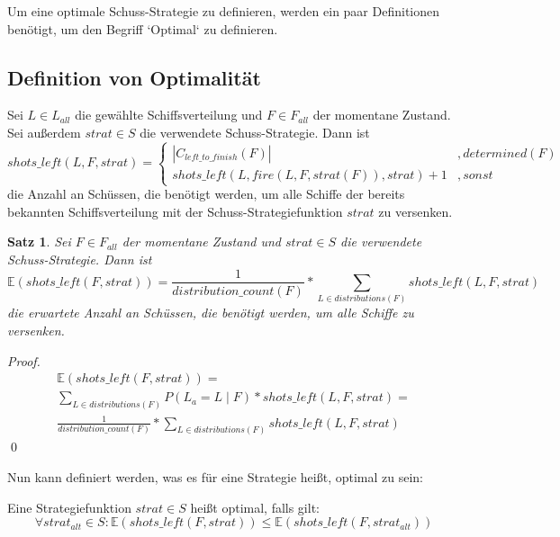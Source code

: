 \documentclass[a4paper,12pt]{llncs}
\numberwithin{equation}{section}
\newtheorem{satz}{Satz}
\begin{document}
Um eine optimale Schuss-Strategie zu definieren, werden ein paar Definitionen benötigt, um den Begriff `Optimal` zu definieren.

\subsection{Definition von Optimalität}

\begin{definition}
Sei $L\in L_{all}$ die gewählte Schiffsverteilung und $F\in F_{all}$ der momentane Zustand.
Sei außerdem $strat \in S$ die verwendete Schuss-Strategie.
Dann ist
\[
shots\_left(L, F, strat)=
  \begin{cases} 
  	|C_{left\_to\_finish}(F)|& ,determined(F) \\
      shots\_left(L, fire(L, F, strat(F)), strat) + 1 & ,sonst
   \end{cases}
\]
die Anzahl an Schüssen, die benötigt werden, um alle Schiffe der bereits bekannten Schiffsverteilung mit der Schuss-Strategiefunktion $strat$ zu versenken.
\end{definition}

\begin{satz}
Sei $F\in F_{all}$ der momentane Zustand und $strat \in S$ die verwendete Schuss-Strategie.
Dann ist
\[
\mathds{E}(shots\_left(F, strat))=\frac{1}{distribution\_count(F)} * \sum_{L \in distributions(F)}{shots\_left(L, F, strat)}
\]
die erwartete Anzahl an Schüssen, die benötigt werden, um alle Schiffe zu versenken.
\end{satz}

\begin{proof}
\begin{align}
\mathds{E}(shots\_left(F, strat))=\\
\sum_{L \in distributions(F)}{P(L_a= L \mid F) * shots\_left(L, F, strat)} =\\
\frac{1}{distribution\_count(F)} * \sum_{L \in distributions(F)}{shots\_left(L, F, strat)}
\end{align}
\qed
\end{proof}

Nun kann definiert werden, was es für eine Strategie heißt, optimal zu sein:
\begin{definition}
Eine Strategiefunktion $strat \in S$ heißt optimal, falls gilt:
\[
\forall strat_{alt} \in S \colon \mathds{E}(shots\_left(F, strat)) \leq \mathds{E}(shots\_left(F, strat_{alt}))
\]
\end{definition}
\end{document}
